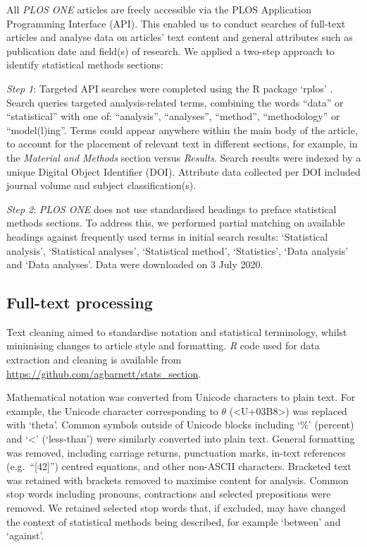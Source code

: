 \documentclass[12pt]{article}
\begin{document}
All \emph{PLOS ONE} articles are freely accessible via the PLOS
Application Programming Interface (API). This enabled us to conduct
searches of full-text articles and analyse data on articles' text
content and general attributes such as publication date and field(s) of
research. We applied a two-step
approach to identify statistical methods sections:

\emph{Step 1}: Targeted API searches were completed using the R package
`rplos' \citep{rplos}. Search queries targeted analysis-related terms,
combining the words ``data'' or ``statistical'' with one of:
``analysis'', ``analyses'', ``method'', ``methodology'' or
``model(l)ing''. Terms could appear anywhere within the main body of the
article, to account for the placement of relevant text in different
sections, for example, in the \emph{Material and Methods} section versus
\emph{Results}. Search results were indexed by a unique Digital Object
Identifier (DOI). Attribute data collected per DOI included journal
volume and subject classification(s).

\emph{Step 2}: \emph{PLOS ONE} does not use standardised headings
to preface statistical methods sections. To address this, we performed
partial matching on available headings against frequently used terms in
initial search results: `Statistical analysis', `Statistical analyses',
`Statistical method', `Statistics', `Data analysis' and `Data analyses'. Data were downloaded on 3 July 2020.

\subsection{Full-text processing}
\label{sec:methods-cleaning}

Text cleaning aimed to standardise notation and statistical terminology,
whilst minimising changes to article style and formatting. \emph{R} code
used for data extraction and cleaning is available from
\url{https://github.com/agbarnett/stats_section}.

Mathematical notation was converted from Unicode characters to plain
text. For example, the Unicode character corresponding to \(\theta\)
(\textless U+03B8\textgreater) was replaced with `theta'. Common symbols
outside of Unicode blocks including `\%' (percent) and `\textless{}'
(`less-than') were similarly converted into plain text. General
formatting was removed, including carriage returns, punctuation marks,
in-text references (e.g.~``{[}42{]}'') centred equations, and other
non-ASCII characters. Bracketed text was retained with brackets removed to
maximise content for analysis. Common stop words
including pronouns, contractions and selected prepositions were removed.
We retained selected stop words that, if excluded, may have changed the
context of statistical methods being described, for example `between'
and `against'.
\end{document}
